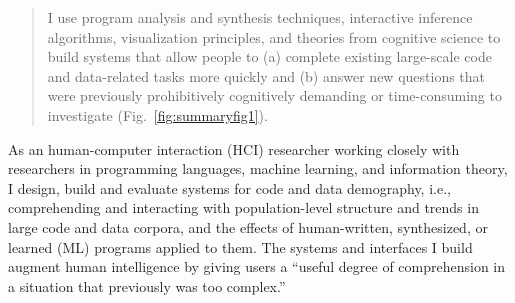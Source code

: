 \documentclass[justified]{tufte-handout}
\begin{document}
\begin{abstract}
I use program analysis and synthesis techniques, interactive inference algorithms, visualization principles, and theories from cognitive science to build systems that allow people to (a) complete existing large-scale code and data-related tasks more quickly and (b) answer new questions that were previously prohibitively cognitively demanding or time-consuming to investigate (Fig.~\ref{fig:summaryfig1}). %
\end{abstract}
As an human-computer interaction (HCI) researcher working closely with researchers in programming languages, machine learning, and information theory, I design, build and evaluate systems for code and data demography, i.e., comprehending and interacting with population-level structure and trends in large code and data corpora, and the effects of human-written, synthesized, or learned (ML) programs applied to them. 
The systems and interfaces I build augment human intelligence by giving users a ``useful degree of comprehension in a situation that previously was too complex.''\cite{engelbart1962}
\end{document}
